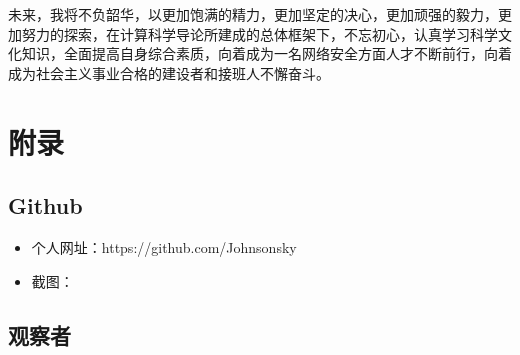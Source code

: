\documentclass{article}
\begin{document}
未来，我将不负韶华，以更加饱满的精力，更加坚定的决心，更加顽强的毅力，更加努力的探索，在计算科学导论所建成的总体框架下，不忘初心，认真学习科学文化知识，全面提高自身综合素质，向着成为一名网络安全方面人才不断前行，向着成为社会主义事业合格的建设者和接班人不懈奋斗。

\section{附录}

\subsection{Github}

\begin{itemize}
    \item 个人网址：https://github.com/Johnsonsky
    \item 截图：
\end{itemize}

\subsection{观察者}
\end{document}
